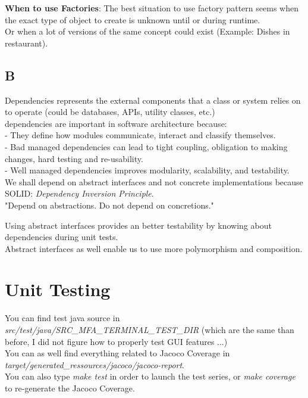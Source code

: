 \documentclass[10pt,a4paper,oneside]{article}
\begin{document}
\textbf{When to use Factories}:
The best situation to use factory pattern seems when the exact type of object to create is unknown until or during runtime.\\
Or when a lot of versions of the same concept could exist (Example: Dishes in restaurant).\\

\subsection{B}
Dependencies represents the external components that a class or system relies on to operate (could be databases, APIs, utility classes, etc.)\\

dependencies are important in software architecture because:\\
- They define how modules communicate, interact and classify themselves.\\
- Bad managed dependencies can lead to tight coupling, obligation to making changes, hard testing and re-usability.\\
- Well managed dependencies improves modularity, scalability, and testability.\\

We shall depend on abstract interfaces and not concrete implementations because SOLID: \textit{Dependency Inversion Principle}.\\
"Depend on abstractions. Do not depend on concretions."

Using abstract interfaces provides an better testability by knowing about dependencies during unit tests.\\
Abstract interfaces as well enable us to use more polymorphism and composition.\\

\section{Unit Testing}
You can find test java source in \textit{src/test/java/SRC\_MFA\_TERMINAL\_TEST\_DIR} (which are the same than before, I did not figure how to properly test GUI features ...)\\
You can as well find everything related to Jacoco Coverage in \textit{target/generated\_ressources/jacoco/jacoco-report}.\\

You can also type \textit{make test} in order to launch the test series, or \textit{make coverage} to re-generate the Jacoco Coverage.\\
\end{document}
